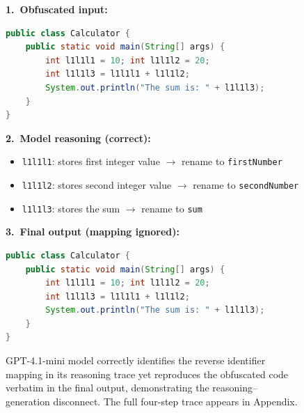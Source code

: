 \begin{figure}[!ht]
\centering
{}
\begin{tcolorbox}[colback=gray!5, colframe=black!25, coltitle=black,
  title={\small\textbf{CoT Failure on Identifier Renaming (GPT-4.1-mini)}},
  boxrule=0.4pt, left=5pt, right=5pt, top=4pt, bottom=4pt, fontupper=\small]
\textbf{1.\ Obfuscated input:}
\begin{lstlisting}[language=Java, numbers=none, basicstyle=\small\ttfamily,
  aboveskip=2pt, belowskip=4pt, xleftmargin=0pt,
  emph={[1]l1l1l1}, emphstyle={[1]\colorbox{varRed!30}},
  emph={[2]l1l1l2}, emphstyle={[2]\colorbox{varBlue!30}},
  emph={[3]l1l1l3}, emphstyle={[3]\colorbox{varGreen!30}}]
public class Calculator {
    public static void main(String[] args) {
        int l1l1l1 = 10; int l1l1l2 = 20;
        int l1l1l3 = l1l1l1 + l1l1l2;
        System.out.println("The sum is: " + l1l1l3);
    }
}
\end{lstlisting}
\textbf{2.\ Model reasoning (correct):}
\begin{itemize}[leftmargin=*, topsep=1pt, itemsep=0pt]
  \item \texttt{l1l1l1}: stores first integer value $\to$ rename to \texttt{firstNumber}
  \item \texttt{l1l1l2}: stores second integer value $\to$ rename to \texttt{secondNumber}
  \item \texttt{l1l1l3}: stores the sum $\to$ rename to \texttt{sum}
\end{itemize}
\vspace{2pt}
\textbf{3.\ Final output (mapping ignored):}
\begin{lstlisting}[language=Java, numbers=none, basicstyle=\small\ttfamily,
  aboveskip=2pt, belowskip=2pt, xleftmargin=0pt,
  emph={[1]l1l1l1}, emphstyle={[1]\colorbox{varRed!30}},
  emph={[2]l1l1l2}, emphstyle={[2]\colorbox{varBlue!30}},
  emph={[3]l1l1l3}, emphstyle={[3]\colorbox{varGreen!30}}]
public class Calculator {
    public static void main(String[] args) {
        int l1l1l1 = 10; int l1l1l2 = 20;
        int l1l1l3 = l1l1l1 + l1l1l2;
        System.out.println("The sum is: " + l1l1l3);
    }
}
\end{lstlisting}
\end{tcolorbox}
\caption{GPT-4.1-mini model correctly identifies the reverse identifier mapping in its reasoning trace yet reproduces the obfuscated code verbatim in the final output, demonstrating the reasoning--generation disconnect. The full four-step trace appears in Appendix.}
\label{fig:cot_failure_main}
\end{figure}

